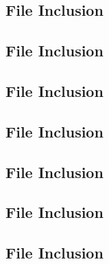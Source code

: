 \documentclass[11pt]{article}
\newcommand{\Verilog}[2][]{%
	
}
\begin{document}
	\subsection*{File Inclusion}
	\Verilog[caption=Add3 Verilog code,label=code:file_ex]{add3.sv}
	
	\subsection*{File Inclusion}
	\Verilog[caption=Add3 Test Benches Verilog code,label=code:file_ex]{add3_test.sv}
	
	
	\subsection*{File Inclusion}
	\Verilog[caption=6-bit BCD Verilog code,label=code:file_ex]{bcd6.sv}
	
	\subsection*{File Inclusion}
	\Verilog[caption=6-bit BCD Test Benches Verilog code,label=code:file_ex]{bcd6_test.sv}
	
	
	\subsection*{File Inclusion}
	\Verilog[caption=11-bit BCD Verilog code,label=code:file_ex]{bcd11.sv}
	
	\subsection*{File Inclusion}
	\Verilog[caption=11-bit BCD Test Benches Verilog code,label=code:file_ex]{bcd11_test.sv}
	
	\subsection*{File Inclusion}
	\Verilog[caption=sseg1 BCD Verilog code,label=code:file_ex]{sseg1_BCD.sv}
\end{document}
